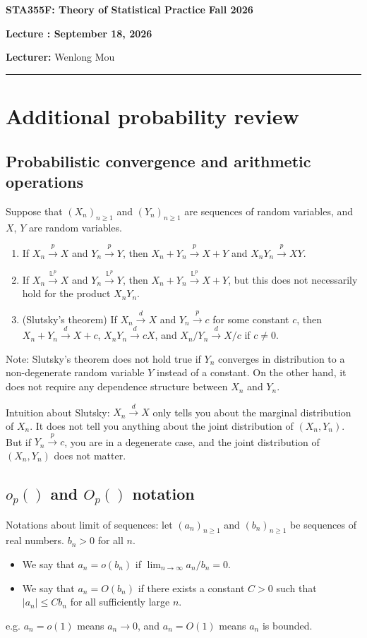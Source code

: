 \documentclass[11pt,letterpaper]{article}
\newcommand{\coursenumber}{STA355F}
\newcommand{\coursetitle}{Theory of Statistical Practice}
\newcommand{\courseterm}{Fall 2026}
\newcounter{lecture}
\newcommand{\lecturenumber}{\arabic{lecture}}
\newcommand{\lecturedate}{September 18, 2026}
\newcommand{\lecturer}{Wenlong Mou}
\numberwithin{theorem}{lecture}
\numberwithin{proposition}{lecture}
\numberwithin{lemma}{lecture}
\numberwithin{claim}{lecture}
\numberwithin{corollary}{lecture}
\numberwithin{definition}{lecture}
\numberwithin{conjecture}{lecture}
\numberwithin{remark}{lecture}
\numberwithin{example}{lecture}
\numberwithin{equation}{lecture}
\newcommand{\makelecturenotesheader}{%
  \noindent
  \textbf{\coursenumber: \coursetitle}%
  \hfill
  \textbf{\courseterm}

  \begin{center}
    {\Large\bfseries Lecture \lecturenumber: \lecturedate}
  \end{center}

  \noindent
  \textbf{Lecturer:} \lecturer
  \par\medskip
  \hrule
  \bigskip
}
\begin{document}
\makelecturenotesheader

\section{Additional probability review}
\subsection{Probabilistic convergence and arithmetic operations}
\begin{theorem}
  Suppose that $(X_n)_{n \geq 1}$ and $(Y_n)_{n \geq 1}$ are sequences of random variables, and $X$, $Y$ are random variables.
  \begin{enumerate}
    \item If $X_n \xrightarrow{p} X$ and $Y_n \xrightarrow{p} Y$, then $X_n + Y_n \xrightarrow{p} X + Y$ and $X_n Y_n \xrightarrow{p} XY$.
    \item If $X_n \xrightarrow{\mathbb{L}^p} X$ and $Y_n \xrightarrow{\mathbb{L}^p} Y$, then $X_n + Y_n \xrightarrow{\mathbb{L}^p} X + Y$, but this does not necessarily hold for the product $X_n Y_n$.
    \item (Slutsky's theorem) If $X_n \xrightarrow{d} X$ and $Y_n \xrightarrow{p} c$ for some constant $c$, then $X_n + Y_n \xrightarrow{d} X + c$, $X_n Y_n \xrightarrow{d} cX$, and $X_n / Y_n \xrightarrow{d} X / c$ if $c \neq 0$.
  \end{enumerate}
\end{theorem}
Note: Slutsky's theorem does not hold true if $Y_n$ converges in distribution to a non-degenerate random variable $Y$ instead of a constant. On the other hand, it does not require any dependence structure between $X_n$ and $Y_n$.

Intuition about Slutsky: $X_n \xrightarrow{d} X$ only tells you about the marginal distribution of $X_n$. It does not tell you anything about the joint distribution of $(X_n, Y_n)$. But if $Y_n \xrightarrow{p} c$, you are in a degenerate case, and the joint distribution of $(X_n, Y_n)$ does not matter.


\subsection{\texorpdfstring{$o_p ()$ and $O_p ()$ notation}{op and Op notation}}
Notations about limit of sequences: let $(a_n)_{n \geq 1}$ and $(b_n)_{n \geq 1}$ be sequences of real numbers. $b_n > 0$ for all $n$.
\begin{itemize}
  \item We say that $a_n = o(b_n)$ if $\lim_{n \to \infty} a_n / b_n = 0$.
  \item We say that $a_n = O(b_n)$ if there exists a constant $C > 0$ such that $|a_n| \leq C b_n$ for all sufficiently large $n$.
\end{itemize}
e.g. $a_n = o(1)$ means $a_n \to 0$, and $a_n = O(1)$ means $a_n$ is bounded.
\end{document}
